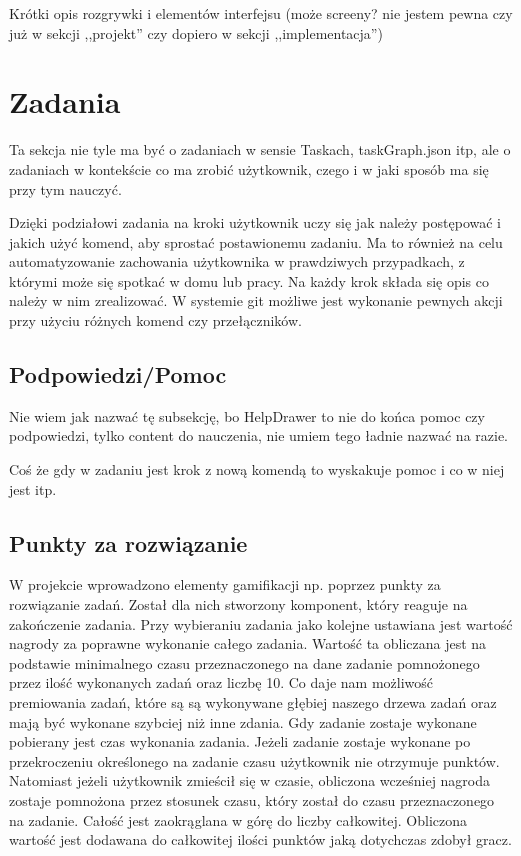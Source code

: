 \documentclass[11pt,a4paper,polish,thesis]{dcsbook}
\begin{document}
	Krótki opis rozgrywki i elementów interfejsu (może screeny? nie jestem pewna czy już w sekcji ,,projekt'' czy dopiero w sekcji ,,implementacja'')
	
	\section{Zadania}
	
	Ta sekcja nie tyle ma być o zadaniach w sensie Taskach, taskGraph.json itp, ale o zadaniach w kontekście co ma zrobić użytkownik, czego i w jaki sposób ma się przy tym nauczyć.
	
	Dzięki podziałowi zadania na kroki użytkownik uczy się jak należy postępować i jakich użyć komend, aby sprostać postawionemu zadaniu. Ma to również na celu automatyzowanie zachowania użytkownika w prawdziwych przypadkach, z którymi może się spotkać w domu lub pracy. Na każdy krok składa się opis co należy w nim zrealizować. W systemie git możliwe jest wykonanie pewnych akcji przy użyciu różnych komend czy przełączników.
	
	\subsection{Podpowiedzi/Pomoc}
	Nie wiem jak nazwać tę subsekcję, bo HelpDrawer to nie do końca pomoc czy podpowiedzi, tylko content do nauczenia, nie umiem tego ładnie nazwać na razie.
	
	Coś że gdy w zadaniu jest krok z nową komendą to wyskakuje pomoc i co w niej jest itp.
	
	\subsection{Punkty za rozwiązanie}
	W projekcie wprowadzono elementy gamifikacji np. poprzez punkty za rozwiązanie zadań. Został dla nich stworzony komponent, który reaguje na zakończenie zadania. Przy wybieraniu zadania jako kolejne ustawiana jest wartość nagrody za poprawne wykonanie całego zadania. Wartość ta obliczana jest na podstawie minimalnego czasu przeznaczonego na dane zadanie pomnożonego przez ilość wykonanych zadań oraz liczbę 10. Co daje nam możliwość premiowania zadań, które są są wykonywane głębiej naszego drzewa zadań oraz mają być wykonane szybciej niż inne zdania. Gdy zadanie zostaje wykonane pobierany jest czas wykonania zadania. Jeżeli zadanie zostaje wykonane po przekroczeniu określonego na zadanie czasu użytkownik nie otrzymuje punktów. Natomiast jeżeli użytkownik zmieścił się w czasie, obliczona wcześniej nagroda zostaje pomnożona przez stosunek czasu, który został do czasu przeznaczonego na zadanie. Całość jest zaokrąglana w górę do liczby całkowitej. Obliczona wartość jest dodawana do całkowitej ilości punktów jaką dotychczas zdobył gracz. 
\end{document}
